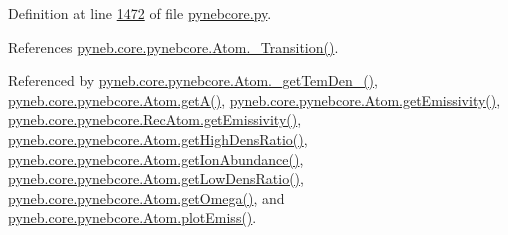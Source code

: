 Definition at line \hyperlink{pynebcore_8py_source_l01472}{1472} of file \hyperlink{pynebcore_8py_source}{pynebcore.\-py}.



References \hyperlink{pynebcore_8py_source_l01433}{pyneb.\-core.\-pynebcore.\-Atom.\-\_\-\-Transition()}.



Referenced by \hyperlink{pynebcore_8py_source_l01869}{pyneb.\-core.\-pynebcore.\-Atom.\-\_\-get\-Tem\-Den\-\_()}, \hyperlink{pynebcore_8py_source_l01537}{pyneb.\-core.\-pynebcore.\-Atom.\-get\-A()}, \hyperlink{pynebcore_8py_source_l01782}{pyneb.\-core.\-pynebcore.\-Atom.\-get\-Emissivity()}, \hyperlink{pynebcore_8py_source_l02990}{pyneb.\-core.\-pynebcore.\-Rec\-Atom.\-get\-Emissivity()}, \hyperlink{pynebcore_8py_source_l01719}{pyneb.\-core.\-pynebcore.\-Atom.\-get\-High\-Dens\-Ratio()}, \hyperlink{pynebcore_8py_source_l02176}{pyneb.\-core.\-pynebcore.\-Atom.\-get\-Ion\-Abundance()}, \hyperlink{pynebcore_8py_source_l01698}{pyneb.\-core.\-pynebcore.\-Atom.\-get\-Low\-Dens\-Ratio()}, \hyperlink{pynebcore_8py_source_l01324}{pyneb.\-core.\-pynebcore.\-Atom.\-get\-Omega()}, and \hyperlink{pynebcore_8py_source_l02384}{pyneb.\-core.\-pynebcore.\-Atom.\-plot\-Emiss()}.


